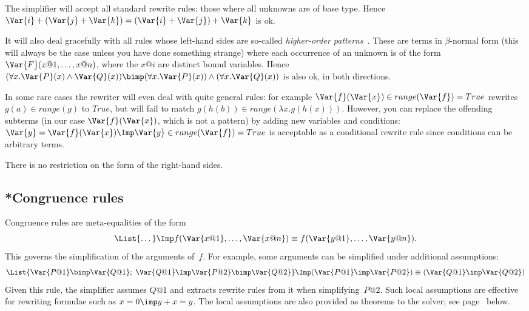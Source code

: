 \begin{warn}
The simplifier will accept all standard rewrite rules: those
where all unknowns are of base type.  Hence ${\Var{i}+(\Var{j}+\Var{k})} =
{(\Var{i}+\Var{j})+\Var{k}}$ is ok.

It will also deal gracefully with all rules whose left-hand sides are
so-called {\em higher-order patterns}~\cite{nipkow-patterns}. These are terms
in $\beta$-normal form (this will always be the case unless you have done
something strange) where each occurrence of an unknown is of the form
$\Var{F}(x@1,\dots,x@n)$, where the $x@i$ are distinct bound variables.
Hence $(\forall x.\Var{P}(x) \land \Var{Q}(x)) \bimp (\forall x.\Var{P}(x))
\land (\forall x.\Var{Q}(x))$ is also ok, in both directions.

In some rare cases the rewriter will even deal with quite general rules: for
example ${\Var{f}(\Var{x})\in range(\Var{f})} = True$ rewrites $g(a) \in
range(g)$ to $True$, but will fail to match $g(h(b)) \in range(\lambda
x.g(h(x)))$. However, you can replace the offending subterms (in our case
$\Var{f}(\Var{x})$, which is not a pattern) by adding new variables and
conditions: $\Var{y} = \Var{f}(\Var{x}) \Imp \Var{y}\in range(\Var{f})
= True$ is acceptable as a conditional rewrite rule since conditions can
be arbitrary terms.

There is no restriction on the form of the right-hand sides.
\end{warn}


\subsection{*Congruence rules}
Congruence rules are meta-equalities of the form
\[ \List{\dots} \Imp
   f(\Var{x@1},\ldots,\Var{x@n}) \equiv f(\Var{y@1},\ldots,\Var{y@n}).
\]
This governs the simplification of the arguments of~$f$.  For
example, some arguments can be simplified under additional assumptions:
\[ \List{\Var{P@1} \bimp \Var{Q@1};\; \Var{Q@1} \Imp \Var{P@2} \bimp \Var{Q@2}}
   \Imp (\Var{P@1} \imp \Var{P@2}) \equiv (\Var{Q@1} \imp \Var{Q@2})
\]
Given this rule, the simplifier assumes $Q@1$ and extracts rewrite rules
from it when simplifying~$P@2$.  Such local assumptions are effective for
rewriting formulae such as $x=0\imp y+x=y$.  The local assumptions are also
provided as theorems to the solver; see page~\pageref{sec:simp-solver} below.

